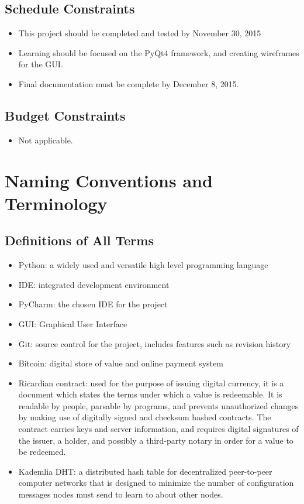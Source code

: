 \documentclass{article}
\begin{document}
\subsection{Schedule Constraints}
\begin{itemize}
	
\item
This project should be completed and tested by November 30, 2015
\item
Learning should be focused on the PyQt4 framework, and creating wireframes for the GUI.
\item
Final documentation must be complete by December 8, 2015.
	
\end{itemize}

\subsection{Budget Constraints}
\begin{itemize}
	
\item
Not applicable.
	
\end{itemize}

\section{Naming Conventions and Terminology}
\subsection{Definitions of All Terms}
\begin{itemize}
	
\item
Python: a widely used and versatile high level programming language
\item
IDE: integrated development environment
\item
PyCharm: the chosen IDE for the project	
\item
GUI: Graphical User Interface
\item
Git: source control for the project, includes features such as revision history
\item
Bitcoin: digital store of value and online payment system
\item
Ricardian contract: used for the purpose of issuing digital currency, it is a document which states the terms under which a value is redeemable. It is readable by people, parsable by programs, and prevents unauthorized changes by making use of digitally signed and checksum hashed contracts. The contract carries keys and server information, and requires digital signatures of the issuer, a holder, and possibly a third-party notary in order for a value to be redeemed.
\item
Kademlia DHT: a distributed hash table for decentralized peer-to-peer computer networks that is designed to minimize the number of configuration messages nodes must send to learn to about other nodes.

\end{itemize}
\end{document}
